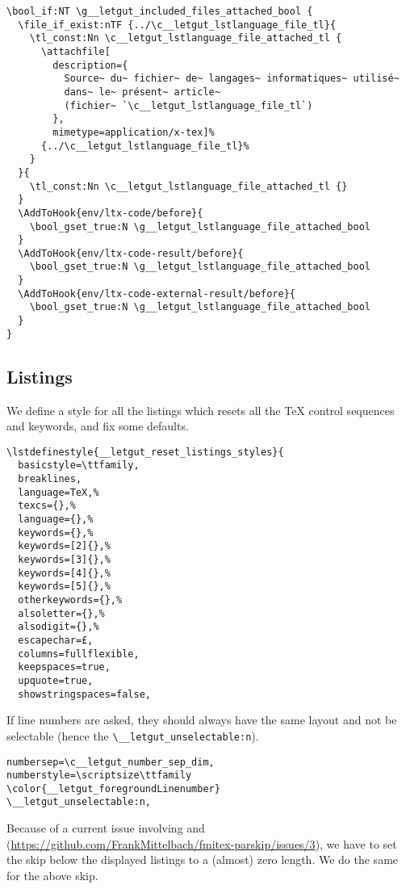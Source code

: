 \documentclass{letgut}
\begin{document}
\begin{lstlisting}
\bool_if:NT \g__letgut_included_files_attached_bool {
  \file_if_exist:nTF {../\c__letgut_lstlanguage_file_tl}{
    \tl_const:Nn \c__letgut_lstlanguage_file_attached_tl {
      \attachfile[
        description={
          Source~ du~ fichier~ de~ langages~ informatiques~ utilisé~
          dans~ le~ présent~ article~
          (fichier~ `\c__letgut_lstlanguage_file_tl`)
        },
        mimetype=application/x-tex]%
      {../\c__letgut_lstlanguage_file_tl}%
    }
  }{
    \tl_const:Nn \c__letgut_lstlanguage_file_attached_tl {}
  }
  \AddToHook{env/ltx-code/before}{
    \bool_gset_true:N \g__letgut_lstlanguage_file_attached_bool
  }
  \AddToHook{env/ltx-code-result/before}{
    \bool_gset_true:N \g__letgut_lstlanguage_file_attached_bool
  }
  \AddToHook{env/ltx-code-external-result/before}{
    \bool_gset_true:N \g__letgut_lstlanguage_file_attached_bool
  }
}
\end{lstlisting}

\subsection{Listings}
\label{ImplementationListings-514h55h0jlj0}
We define a style for all the listings which resets all the \TeX{} control
sequences and keywords, and fix some defaults.

\begin{lstlisting}
\lstdefinestyle{__letgut_reset_listings_styles}{
  basicstyle=\ttfamily,
  breaklines,
  language=TeX,%
  texcs={},%
  language={},%
  keywords={},%
  keywords=[2]{},%
  keywords=[3]{},%
  keywords=[4]{},%
  keywords=[5]{},%
  otherkeywords={},%
  alsoletter={},%
  alsodigit={},%
  escapechar=£,
  columns=fullflexible,
  keepspaces=true,
  upquote=true,
  showstringspaces=false,
\end{lstlisting}

If line numbers are asked, they should always have the same layout and not be
selectable (hence the \lstinline+\__letgut_unselectable:n+).

\begin{lstlisting}
numbersep=\c__letgut_number_sep_dim,
numberstyle=\scriptsize\ttfamily
\color{__letgut_foregroundLinenumber}
\__letgut_unselectable:n,
\end{lstlisting}

Because of a current issue involving  and 
(\url{https://github.com/FrankMittelbach/fmitex-parskip/issues/3}), we have to
set the skip below the displayed listings to a (almost) zero length. We do the
same for the above skip.
\end{document}
